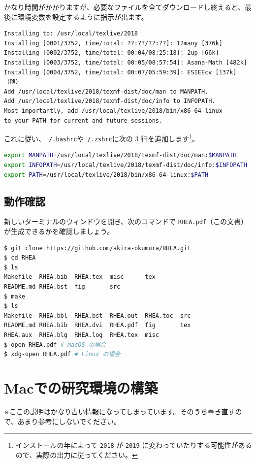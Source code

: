 かなり時間がかかりますが、必要なファイルを全てダウンロードし終えると、最後に環境変数を設定するように指示が出ます。

\begin{lstlisting}
Installing to: /usr/local/texlive/2018
Installing [0001/3752, time/total: ??:??/??:??]: 12many [376k]
Installing [0002/3752, time/total: 00:04/08:25:18]: 2up [66k]
Installing [0003/3752, time/total: 00:05/08:57:54]: Asana-Math [482k]
Installing [0004/3752, time/total: 00:07/05:59:39]: ESIEEcv [137k]
（略）
Add /usr/local/texlive/2018/texmf-dist/doc/man to MANPATH.
Add /usr/local/texlive/2018/texmf-dist/doc/info to INFOPATH.
Most importantly, add /usr/local/texlive/2018/bin/x86_64-linux
to your PATH for current and future sessions.
\end{lstlisting}

これに従い、\texttt{~/.bashrc}や\texttt{~/.zshrc}に次の 3 行を追加します\footnote{インストールの年によって \texttt{2018} が \texttt{2019} に変わっていたりする可能性があるので、実際の出力に従ってください。}。

\begin{lstlisting}[language=bash]
export MANPATH=/usr/local/texlive/2018/texmf-dist/doc/man:$MANPATH
export INFOPATH=/usr/local/texlive/2018/texmf-dist/doc/info:$INFOPATH
export PATH=/usr/local/texlive/2018/bin/x86_64-linux:$PATH
\end{lstlisting}

\section{動作確認}

新しいターミナルのウィンドウを開き、次のコマンドで \texttt{RHEA.pdf}（この文書）が生成できるかを確認しましょう。

\begin{lstlisting}[language=bash]
$ git clone https://github.com/akira-okumura/RHEA.git
$ cd RHEA
$ ls
Makefile  RHEA.bib  RHEA.tex  misc      tex
README.md RHEA.bst  fig       src
$ make
$ ls
Makefile  RHEA.bbl  RHEA.bst  RHEA.out  RHEA.toc  src
README.md RHEA.bib  RHEA.dvi  RHEA.pdf  fig       tex
RHEA.aux  RHEA.blg  RHEA.log  RHEA.tex  misc
$ open RHEA.pdf # macOS の場合
$ xdg-open RHEA.pdf # Linux の場合
\end{lstlisting}

\chapter{Macでの研究環境の構築}
※ここの説明はかなり古い情報になってしまっています。そのうち書き直すので、あまり参考にしないでください。

